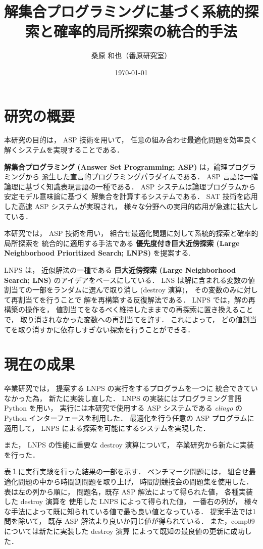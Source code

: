 \documentclass[a4j,10pt]{jarticle}
\title{解集合プログラミングに基づく系統的探索と確率的局所探索の統合的手法}
\author{桑原 和也（番原研究室）}
\date{\today}
\begin{document}
\maketitle
\thispagestyle{empty}
\begin{multicols}{1}

\section{研究の概要}
本研究の目的は，
ASP 技術を用いて，
任意の組み合わせ最適化問題を効率良く
解くシステムを実現することである．

\textbf{解集合プログラミング (Answer Set Programming; ASP)}
は，論理プログラミングから
派生した宣言的プログラミングパラダイムである．
ASP 言語は一階論理に基づく知識表現言語の一種である．
ASP システムは論理プログラムから
安定モデル意味論に基づく
解集合を計算するシステムである．
SAT 技術を応用した高速 ASP システムが実現され，
様々な分野への実用的応用が急速に拡大している．

本研究では，
ASP 技術を用い，
組合せ最適化問題に対して系統的探索と確率的局所探索を
統合的に適用する手法である
\textbf{優先度付き巨大近傍探索 (Large Neighborhood Prioritized Search; LNPS)}
を提案する.

LNPS は，
近似解法の一種である
\textbf{巨大近傍探索 (Large Neighborhood Search; LNS)}
のアイデアをベースにしている．
LNS は解に含まれる変数の値割当ての一部をランダムに選んで取り消し (destroy 演算)，
その変数のみに対して再割当てを行うことで
解を再構築する反復解法である\cite{Psinger_10}．
LNPS では，解の再構築の操作を，
値割当てをなるべく維持したままでの再探索に置き換えることで，
取り消されなかった変数への再割当てを許す．
これによって，
どの値割当てを取り消すかに依存しすぎない探索を行うことができる．

\section{現在の成果}
卒業研究では，
提案する LNPS の実行をするプログラムを一つに
統合できていなかった為，
新たに実装し直した．
LNPS の実装にはプログラミング言語 Python を用い，
実行には本研究で使用する
ASP システムである
\textit{clingo} の Python インターフェースを利用した．
最適化を行う任意の ASP プログラムに適用して，
LNPS による探索を可能にするシステムを実現した．

また，
LNPS の性能に重要な destroy 演算について，
卒業研究から新たに実装を行った．

表１に実行実験を行った結果の一部を示す．
ベンチマーク問題には，
組合せ最適化問題の中から時間割問題を取り上げ，
時間割競技会の問題集を使用した．
表は左の列から順に，
問題名，既存 ASP 解法によって得られた値，
各種実装した destroy 演算を
使用した LNPS によって得られた値，
一番右の列が，
様々な手法によって既に知られている値で最も良い値となっている．
提案手法では1問を除いて，
既存 ASP 解法より良いか同じ値が得られている．
また，comp09 については新たに実装した destroy 演算
によって既知の最良値の更新に成功した．


\end{multicols}
\end{document}
